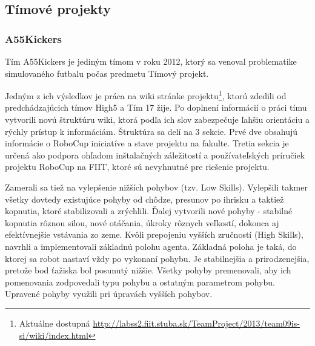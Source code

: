 \subsection{Tímové projekty}

\subsubsection{A55Kickers}\label{A55Kickers}

Tím A55Kickers \cite{A55Kickers} je jediným tímom v roku 2012, ktorý sa venoval problematike simulovaného futbalu počas predmetu Tímový projekt. 

Jedným z ich výsledkov je práca na wiki stránke projektu\footnote{Aktuálne dostupná \url{http://labss2.fiit.stuba.sk/TeamProject/2013/team09is-si/wiki/index.html}}, ktorú zdedili od predchádzajúcich tímov High5 a Tím 17 žije. Po doplnení informácií o práci tímu vytvorili novú štruktúru wiki, ktorá podľa ich slov zabezpečuje ľahšiu orientáciu a rýchly prístup k informáciám. Štruktúra sa delí na 3 sekcie. Prvé dve obsahujú informácie o RoboCup iniciatíve a stave projektu na fakulte. Tretia sekcia je určená ako podpora ohľadom inštalačných záležitostí a používateľských príručiek projektu RoboCup na FIIT, ktoré sú nevyhnutné pre riešenie projektu.

Zamerali sa tiež na vylepšenie nižších pohybov (tzv. Low Skills). Vylepšili takmer všetky dovtedy existujúce pohyby od chôdze, presunov po ihrisku a taktiež kopnutia, ktoré stabilizovali a zrýchlili. Ďalej vytvorili nové pohyby - stabilné kopnutia rôznou silou, nové otáčania, úkroky rôznych veľkostí, dokonca aj efektívnejšie vstávania zo zeme. Kvôli prepojeniu vyšších zručností (High Skills), navrhli a implementovali základnú polohu agenta. Základná poloha je taká, do ktorej sa robot nastaví vždy po vykonaní pohybu. Je stabilnejšia a prirodzenejšia, pretože bod ťažiska bol posunutý nižšie. Všetky pohyby premenovali, aby ich pomenovania zodpovedali typu pohybu a ostatným parametrom pohybu. Upravené pohyby využili pri úpravách vyšších pohybov.

